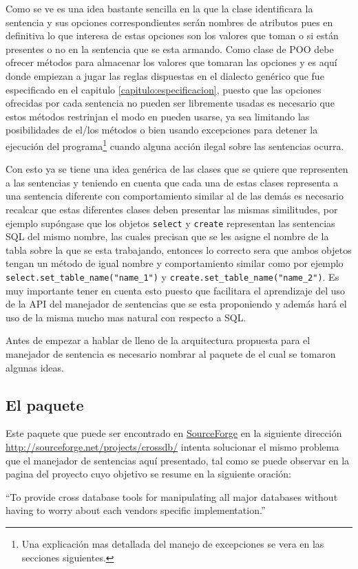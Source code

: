 Como se ve es una idea bastante sencilla en la que la clase identificara la sentencia y sus opciones correspondientes serán nombres de atributos pues en definitiva lo que interesa de estas opciones son los valores que toman o si están presentes o no en la sentencia que se esta armando. Como clase de POO debe ofrecer métodos para almacenar los valores que tomaran las opciones y es aquí donde empiezan a jugar las reglas dispuestas en el dialecto genérico que fue especificado en el capitulo \ref{capitulo:especificacion}, puesto que las opciones ofrecidas por cada sentencia no pueden ser libremente usadas es necesario que estos métodos restrinjan el modo en pueden usarse, ya sea limitando las posibilidades de el/los métodos o bien usando excepciones para detener la ejecución del programa\footnote{Una explicación mas detallada del manejo de excepciones se vera en las secciones siguientes.} cuando alguna acción ilegal sobre las sentencias ocurra.

Con esto ya se tiene una idea genérica de las clases que se quiere que representen a las sentencias y teniendo en cuenta que cada una de estas clases representa a una sentencia diferente con comportamiento similar al de las demás es necesario recalcar que estas diferentes clases deben presentar las mismas similitudes, por ejemplo supóngase que los objetos \verb|select| y \verb|create| representan las sentencias SQL del mismo nombre, las cuales precisan que se les asigne el nombre de la tabla sobre la que se esta trabajando, entonces lo correcto sera que ambos objetos tengan un método de igual nombre y comportamiento similar como por ejemplo \verb=select.set_table_name("name_1")= y \verb=create.set_table_name("name_2")=. Es muy importante tener en cuenta esto puesto que facilitara el aprendizaje del uso de la API del manejador de sentencias que se esta proponiendo y además hará el uso de la misma mucho mas natural con respecto a SQL.

Antes de empezar a hablar de lleno de la arquitectura propuesta para el manejador de sentencia es necesario nombrar al paquete \cc de el cual se tomaron algunas ideas.
%
\subsection{El paquete \cc}
Este paquete que puede ser encontrado en \href{http://sourceforge.net}{SourceForge} en la siguiente dirección \url{http://sourceforge.net/projects/crossdb/} intenta solucionar el mismo problema que el manejador de sentencias aquí presentado, tal como se puede observar en la pagina del proyecto cuyo objetivo se resume en la siguiente oración:
%
\begin{center}
``To provide cross database tools for manipulating all major databases without having to worry about each vendors specific implementation.''
\end{center} 

